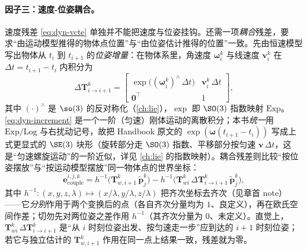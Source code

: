 \paragraph{因子三：速度-位姿耦合。}
速度残差 \cref{eq:dyn-vcte} 单独并不能把速度与位姿挂钩。还需一项\emph{耦合}残差，要求“由运动模型推得的物体点位置”与“由位姿估计推得的位置”一致。先由恒速模型写出物体从 $t_i$ 到 $t_{i+1}$ 的\emph{位姿增量}：在物体系里，角速度 $\boldsymbol\omega_i^{k}$ 与线速度 $\mathbf{v}_i^{k}$ 在 $\Delta t=t_{i+1}-t_i$ 内积分为
\begin{equation}
  \Delta\mathbf{T}^{k}_{i\to i+1}
  =\begin{bmatrix}\exp\!\big((\boldsymbol\omega_i^{k})^\wedge\,\Delta t\big) & \mathbf{v}_i^{k}\,\Delta t\\[1mm] \mathbf{0}^\top & 1\end{bmatrix},
  \label{eq:dyn-increment}
\end{equation}
其中 $(\cdot)^\wedge$ 是 $\so(3)$ 的反对称化（\cref{ch:lie}），$\exp$ 即 $\SO(3)$ 指数映射 $\mathrm{Exp}$。\cref{eq:dyn-increment} 是一个一阶（匀速）刚体运动的离散积分；本书\emph{统一}用 $\mathrm{Exp}/\mathrm{Log}$ 与右扰动记号，故把 Handbook 原文的 $\exp(\boldsymbol\omega(t_{i+1}-t_i))$ 写成上式更显式的 $\SE(3)$ 块形（旋转部分走 $\SO(3)$ 指数、平移部分按匀速 $\mathbf{v}\,\Delta t$，这是“匀速螺旋运动”的一阶近似，详见 \cref{ch:lie} 的指数映射）。耦合残差则比较“按位姿摆放”与“按运动模型摆放”同一物体点的世界坐标：
\begin{equation}
  \mathbf{e}_{\mathrm{couple}}^{i,j,k}
  =h^{-1}\!\big(\mathbf{T}_{w,i+1}^{k}\,\tilde{\mathbf{p}}_j^{k}\big)-h^{-1}\!\big(\mathbf{T}_{wi}^{k}\,\Delta\mathbf{T}^{k}_{i\to i+1}\,\tilde{\mathbf{p}}_j^{k}\big),
  \label{eq:dyn-couple}
\end{equation}
其中 $h^{-1}:(x,y,z,\lambda)\mapsto(x/\lambda,y/\lambda,z/\lambda)$ 把齐次坐标去齐次（见章首 note）——它\emph{分别}作用于两个变换后的点（各自齐次分量均为 $1$、良定义），再在欧氏空间作差；切勿先对两位姿之差作用 $h^{-1}$（其齐次分量为 $0$、未定义）。直觉上，$\mathbf{T}_{wi}^{k}\,\Delta\mathbf{T}^{k}_{i\to i+1}$ 是“从 $i$ 时刻位姿出发、按匀速走一步”应到达的 $i+1$ 时刻位姿；若它与独立估计的 $\mathbf{T}_{w,i+1}^{k}$ 作用在同一点上结果一致，残差就为零。

